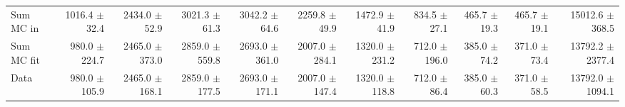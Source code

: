 \begin{table}[htbp]
{\begin{tabular}{lrrrrrrrrrr}
\hline
Sum MC in & 1016.4 $\pm$ 32.4 & 2434.0 $\pm$ 52.9 & 3021.3 $\pm$ 61.3 & 3042.2 $\pm$ 64.6 & 2259.8 $\pm$ 49.9 & 1472.9 $\pm$ 41.9 & 834.5 $\pm$ 27.1 & 465.7 $\pm$ 19.3 & 465.7 $\pm$ 19.1& 15012.6 $\pm$ 368.5 \\
Sum MC fit & 980.0 $\pm$ 224.7 & 2465.0 $\pm$ 373.0 & 2859.0 $\pm$ 559.8 & 2693.0 $\pm$ 361.0 & 2007.0 $\pm$ 284.1 & 1320.0 $\pm$ 231.2 & 712.0 $\pm$ 196.0 & 385.0 $\pm$ 74.2 & 371.0 $\pm$ 73.4 & 13792.2 $\pm$ 2377.4 \\
\hline
Data & 980.0 $\pm$ 105.9 & 2465.0 $\pm$ 168.1 & 2859.0 $\pm$ 177.5 & 2693.0 $\pm$ 171.1 & 2007.0 $\pm$ 147.4 & 1320.0 $\pm$ 118.8 & 712.0 $\pm$ 86.4 & 385.0 $\pm$ 60.3 & 371.0 $\pm$ 58.5 & 13792.0 $\pm$ 1094.1 \\
\hline
\end{tabular}
}
\end{table}
